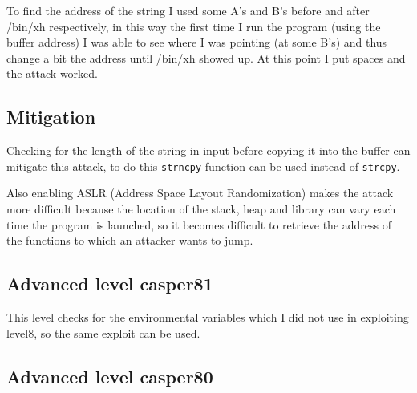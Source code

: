 \documentclass[a4paper,12pt]{article}
\begin{document}
To find the address of the string I used some A's and B's before and after /bin/xh respectively, in this way the first time I run the program (using the buffer address) I was able to see where I was pointing (at some B's) and thus change a bit the address until /bin/xh showed up. At this point I put spaces and the attack worked.







\subsection{Mitigation}

Checking for the length of the string in input before copying it into the buffer can mitigate this attack, to do this \texttt{strncpy} function can be used instead of \texttt{strcpy}.

Also enabling ASLR (Address Space Layout Randomization) makes the attack more difficult because the location of the stack, heap and library can vary each time the program is launched, so it becomes difficult to retrieve the address of the functions to which an attacker wants to jump.

\subsection{Advanced level casper81}

This level checks for the environmental variables which I did not use in exploiting level8, so the same exploit can be used.

\subsection{Advanced level casper80}
\end{document}
